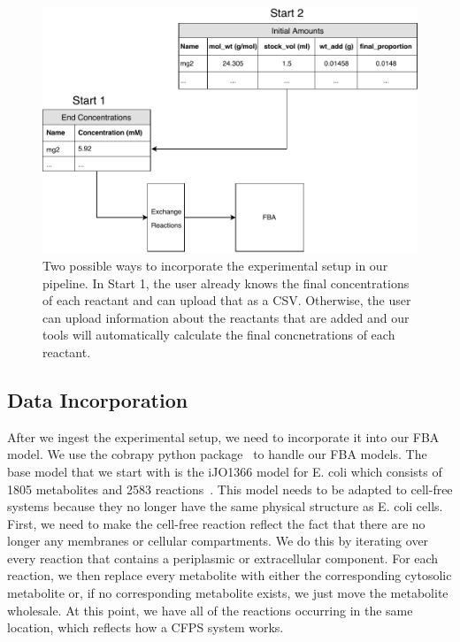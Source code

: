 \begin{figure}[t!]
\begin{center}
\includegraphics{figs/DataIngestion.pdf}
\caption{Two possible ways to incorporate the experimental setup in our pipeline.
In Start 1, the user already knows the final concentrations of each reactant and can upload that as a CSV.
Otherwise, the user can upload information about the reactants that are added and our tools will automatically calculate the final concnetrations of each reactant.}
\end{center}
\label{fig:ingest}
\end{figure}

\subsection{Data Incorporation} \label{sec:incorp}
After we ingest the experimental setup, we need to incorporate it into our FBA model.
We use the cobrapy python package~\cite{ebrahim2013cobrapy} to handle our FBA models.
The base model that we start with is the iJO1366 model for E. coli which consists of 1805 metabolites and 2583 reactions~\cite{orth2011comprehensive}.
This model needs to be adapted to cell-free systems because they no longer have the same physical structure as E. coli cells.
First, we need to make the cell-free reaction reflect the fact that there are no longer any membranes or cellular compartments.
We do this by iterating over every reaction that contains a periplasmic or extracellular component.
For each reaction, we then replace every metabolite with either the corresponding cytosolic metabolite or, if no corresponding metabolite exists, we just move the metabolite wholesale.
At this point, we have all of the reactions occurring in the same location, which reflects how a CFPS system works.

